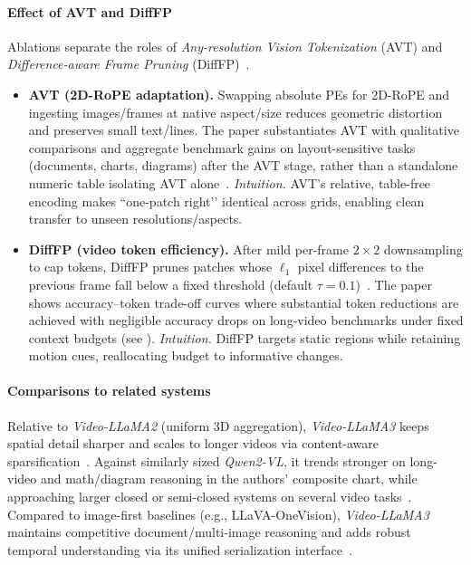 \begin{enrichment}
\begin{enrichment}
        \paragraph{Effect of AVT and DiffFP}
        Ablations separate the roles of \emph{Any\mbox{-}resolution Vision Tokenization} (AVT) and \emph{Difference\mbox{-}aware Frame Pruning} (DiffFP)~\cite[Sec.~3.1; Sec.~2.2; Sec.~4]{zhang2025_videollama3}.
        \begin{itemize}
            \item \textbf{AVT (2D\mbox{-}RoPE adaptation).} Swapping absolute PEs for 2D\mbox{-}RoPE and ingesting images/frames at native aspect/size reduces geometric distortion and preserves small text/lines. The paper substantiates AVT with qualitative comparisons and aggregate benchmark gains on layout\mbox{-}sensitive tasks (documents, charts, diagrams) after the AVT stage, rather than a standalone numeric table isolating AVT alone~\cite[Fig.~2; Sec.~3.1; Sec.~4]{zhang2025_videollama3}. \emph{Intuition.} AVT’s relative, table\mbox{-}free encoding makes “one\mbox{-}patch right’’ identical across grids, enabling clean transfer to unseen resolutions/aspects.
            \item \textbf{DiffFP (video token efficiency).} After mild per\mbox{-}frame $2{\times}2$ downsampling to cap tokens, DiffFP prunes patches whose $\ell_1$ pixel differences to the previous frame fall below a fixed threshold (default $\tau{=}0.1$)~\cite[Sec.~2.2]{zhang2025_videollama3}. The paper shows accuracy–token trade\mbox{-}off curves where substantial token reductions are achieved with negligible accuracy drops on long\mbox{-}video benchmarks under fixed context budgets (see \cite[Fig.~4; Sec.~4]{zhang2025_videollama3}). \emph{Intuition.} DiffFP targets static regions while retaining motion cues, reallocating budget to informative changes.
        \end{itemize}
        
        \paragraph{Comparisons to related systems}
        Relative to \emph{Video\mbox{-}LLaMA2} (uniform 3D aggregation), \emph{Video\mbox{-}LLaMA3} keeps spatial detail sharper and scales to longer videos via content\mbox{-}aware sparsification~\cite[Sec.~2; Fig.~1]{zhang2025_videollama3,cheng2024_videollama2}. Against similarly sized \emph{Qwen2\mbox{-}VL}, it trends stronger on long\mbox{-}video and math/diagram reasoning in the authors’ composite chart, while approaching larger closed or semi\mbox{-}closed systems on several video tasks~\cite[Fig.~1]{zhang2025_videollama3}. Compared to image\mbox{-}first baselines (e.g., LLaVA\mbox{-}OneVision), \emph{Video\mbox{-}LLaMA3} maintains competitive document/multi\mbox{-}image reasoning and adds robust temporal understanding via its unified serialization interface~\cite[Sec.~3.3; Sec.~4]{zhang2025_videollama3}.
        

\end{enrichment}
\end{enrichment}
